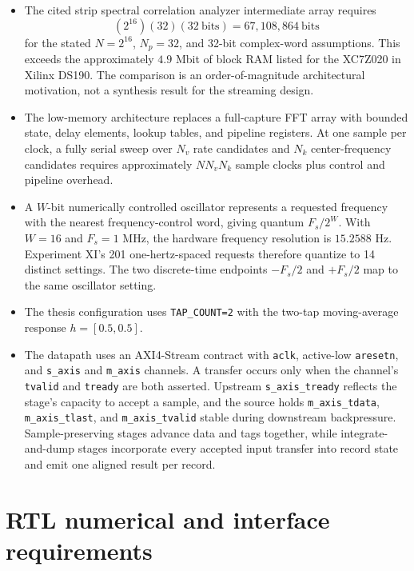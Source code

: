 \documentclass[12pt]{article}
\begin{document}
\begin{itemize}
  \item The cited strip spectral correlation analyzer intermediate array requires
  \[
    (2^{16})(32)(32\ \text{bits})=67{,}108{,}864\ \text{bits}
  \]
  for the stated $N=2^{16}$, $N_p=32$, and 32-bit complex-word assumptions. This exceeds the approximately $4.9$ Mbit of block RAM listed for the XC7Z020 in Xilinx DS190. The comparison is an order-of-magnitude architectural motivation, not a synthesis result for the streaming design.

  \item The low-memory architecture replaces a full-capture FFT array with bounded state, delay elements, lookup tables, and pipeline registers. At one sample per clock, a fully serial sweep over $N_v$ rate candidates and $N_k$ center-frequency candidates requires approximately $NN_vN_k$ sample clocks plus control and pipeline overhead.

  \item A $W$-bit numerically controlled oscillator represents a requested frequency with the nearest frequency-control word, giving quantum $F_s/2^W$. With $W=16$ and $F_s=1$ MHz, the hardware frequency resolution is $15.2588$ Hz. Experiment XI's 201 one-hertz-spaced requests therefore quantize to 14 distinct settings. The two discrete-time endpoints $-F_s/2$ and $+F_s/2$ map to the same oscillator setting.

  \item The thesis configuration uses \texttt{TAP\_COUNT=2} with the two-tap moving-average response $h=[0.5,0.5]$.

  \item The datapath uses an AXI4-Stream contract with \texttt{aclk}, active-low \texttt{aresetn}, and \texttt{s\_axis} and \texttt{m\_axis} channels. A transfer occurs only when the channel's \texttt{tvalid} and \texttt{tready} are both asserted. Upstream \texttt{s\_axis\_tready} reflects the stage's capacity to accept a sample, and the source holds \texttt{m\_axis\_tdata}, \texttt{m\_axis\_tlast}, and \texttt{m\_axis\_tvalid} stable during downstream backpressure. Sample-preserving stages advance data and tags together, while integrate-and-dump stages incorporate every accepted input transfer into record state and emit one aligned result per record.
\end{itemize}

\section{RTL numerical and interface requirements}
\end{document}
